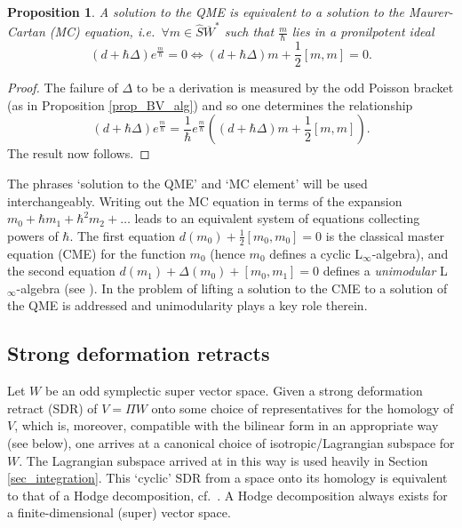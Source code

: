 \documentclass[]{amsart}
\newtheorem{proposition}[theorem]{Proposition}
\theoremstyle{definition}
\newcommand{\Linf}{L$_\infty$}
\begin{document}
\begin{proposition}
A solution to the QME is equivalent to a solution to the Maurer-Cartan (MC) equation, i.e.~$\forall m\in \hat{S}\overline{W}^*$ such that $\frac{m}{\hbar}$ lies in a pronilpotent ideal
\[
(d+\hbar\Delta) e^\frac{m}{\hbar}=0 \Leftrightarrow (d+\hbar\Delta) m +\frac{1}{2} [m, m]=0.
\]
\end{proposition}
\begin{proof}
The failure of $\Delta$ to be a derivation is measured by the odd Poisson bracket (as in Proposition \ref{prop_BV_alg}) and so one determines the relationship
\[
(d+\hbar\Delta) e^\frac{m}{\hbar}=\frac{1}{\hbar}e^\frac{m}{\hbar}\left((d+\hbar\Delta) m +\frac{1}{2} [m, m]\right).
\]
The result now follows.
\end{proof}

The phrases `solution to the QME' and `MC element' will be used interchangeably. Writing out the MC equation in terms of the expansion $m_0+\hbar m_1 +\hbar^2 m_2 +\dots$ leads to an equivalent system of equations collecting powers of $\hbar$. The first equation $d(m_0) +\frac{1}{2} [m_0, m_0]= 0$ is the classical master equation (CME) for the function $m_0$ (hence $m_0$ defines a cyclic \Linf-algebra), and the second equation $d(m_1) + \Delta (m_0) + [m_0, m_1]=0 $ defines a \emph{unimodular} \Linf-algebra (see \cite{braun_laz_unimodular,granaker}). In \cite{braun_laz_unimodular} the problem of lifting a solution to the CME to a solution of the QME is addressed and unimodularity plays a key role therein.

\subsection{Strong deformation retracts}\label{sec_decomp}

Let $W$ be an odd symplectic super vector space. Given a strong deformation retract (SDR) of $V=\Pi W$ onto some choice of representatives for the homology of $V$, which is, moreover, compatible with the bilinear form in an appropriate way (see below), one arrives at a canonical choice of isotropic/Lagrangian subspace for $W$. The Lagrangian subspace arrived at in this way is used heavily in Section \ref{sec_integration}. This `cyclic' SDR from a space onto its homology is equivalent to that of a Hodge decomposition, cf.~\cite{chuang_laz_feynman,chuang_laz_hodge}. A Hodge decomposition always exists for a finite-dimensional (super) vector space.
\end{document}
